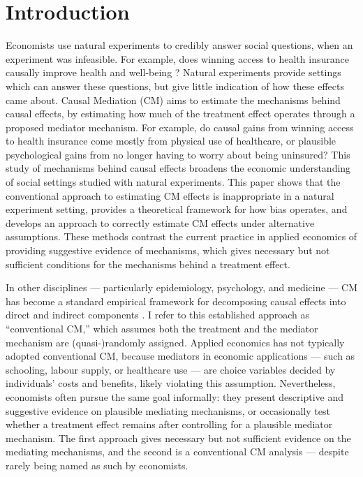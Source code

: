 \section{Introduction}
\label{sec:intro}
Economists use natural experiments to credibly answer social questions, when an experiment was infeasible.
For example, does winning access to health insurance causally improve health and well-being \citep{finkelstein2008oregon}?
Natural experiments provide settings which can answer these questions, but give little indication of how these effects came about.
Causal Mediation (CM) aims to estimate the mechanisms behind causal effects, by estimating how much of the treatment effect operates through a proposed mediator mechanism.
For example, do causal gains from winning access to health insurance come mostly from physical use of healthcare, or plausible psychological gains from no longer having to worry about being uninsured?
This study of mechanisms behind causal effects broadens the economic understanding of social settings studied with natural experiments.
This paper shows that the conventional approach to estimating CM effects is inappropriate in a natural experiment setting, provides a theoretical framework for how bias operates, and develops an approach to correctly estimate CM effects under alternative assumptions.
These methods contrast the current practice in applied economics of providing suggestive evidence of mechanisms, which gives necessary but not sufficient conditions for the mechanisms behind a treatment effect.

In other disciplines --- particularly epidemiology, psychology, and medicine --- CM has become a standard empirical framework for decomposing causal effects into direct and indirect components \citep{imai2010identification}.
I refer to this established approach as ``conventional CM,'' which assumes both the treatment and the mediator mechanism are (quasi-)randomly assigned.
Applied economics has not typically adopted conventional CM, because mediators in economic applications --- such as schooling, labour supply, or healthcare use --- are choice variables decided by individuals' costs and benefits, likely violating this assumption.
Nevertheless, economists often pursue the same goal informally: 
they present descriptive and suggestive evidence on plausible mediating mechanisms, or occasionally test whether a treatment effect remains after controlling for a plausible mediator mechanism.
The first approach gives necessary but not sufficient evidence on the mediating mechanisms, and the second is a conventional CM analysis --- despite rarely being named as such by economists.

